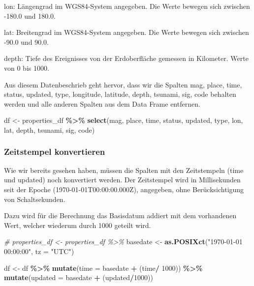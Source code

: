 \documentclass[
]{article}
\newenvironment{Shaded}{\begin{snugshade}}{\end{snugshade}}
\newcommand{\AttributeTok}[1]{\textcolor[rgb]{0.13,0.29,0.53}{#1}}
\newcommand{\CommentTok}[1]{\textcolor[rgb]{0.56,0.35,0.01}{\textit{#1}}}
\newcommand{\DecValTok}[1]{\textcolor[rgb]{0.00,0.00,0.81}{#1}}
\newcommand{\FunctionTok}[1]{\textcolor[rgb]{0.13,0.29,0.53}{\textbf{#1}}}
\newcommand{\NormalTok}[1]{#1}
\newcommand{\OtherTok}[1]{\textcolor[rgb]{0.56,0.35,0.01}{#1}}
\newcommand{\SpecialCharTok}[1]{\textcolor[rgb]{0.81,0.36,0.00}{\textbf{#1}}}
\newcommand{\StringTok}[1]{\textcolor[rgb]{0.31,0.60,0.02}{#1}}
\begin{document}
lon: Längengrad im WGS84-System angegeben. Die Werte bewegen sich
zwischen -180.0 und 180.0.

lat: Breitengrad im WGS84-System angegeben. Die Werte bewegen sich
zwischen -90.0 und 90.0.

depth: Tiefe des Ereignisses von der Erdoberfläche gemessen in
Kilometer. Werte von 0 bis 1000.

Aus diesem Datenbeschrieb geht hervor, dass wir die Spalten mag, place,
time, status, updated, type, longitude, latitude, depth, tsunami, sig,
code behalten werden und alle anderen Spalten aus dem Data Frame
entfernen.

\begin{Shaded}
\begin{Highlighting}[]
\NormalTok{df }\OtherTok{\textless{}{-}}\NormalTok{ properties\_df }\SpecialCharTok{\%\textgreater{}\%} \FunctionTok{select}\NormalTok{(mag, place, time, status, updated, type, lon, lat, depth, tsunami, sig, code)}
\end{Highlighting}
\end{Shaded}

\hypertarget{zeitstempel-konvertieren}{%
\subsubsection{Zeitstempel
konvertieren}\label{zeitstempel-konvertieren}}

Wie wir bereits gesehen haben, müssen die Spalten mit den Zeitstempeln
(time und updated) noch konvertiert werden. Der Zeitstempel wird in
Millisekunden seit der Epoche (1970-01-01T00:00:00.000Z), angegeben,
ohne Berücksichtigung von Schaltsekunden.

Dazu wird für die Berechnung das Basisdatum addiert mit dem vorhandenen
Wert, welcher wiederum durch 1000 geteilt wird.

\begin{Shaded}
\begin{Highlighting}[]
\CommentTok{\# properties\_df \textless{}{-} properties\_df \%\textgreater{}\% }
\NormalTok{basedate }\OtherTok{\textless{}{-}} \FunctionTok{as.POSIXct}\NormalTok{(}\StringTok{"1970{-}01{-}01 00:00:00"}\NormalTok{, }\AttributeTok{tz =} \StringTok{"UTC"}\NormalTok{)}

\NormalTok{df }\OtherTok{\textless{}{-}}\NormalTok{ df }\SpecialCharTok{\%\textgreater{}\%} 
  \FunctionTok{mutate}\NormalTok{(}\AttributeTok{time =}\NormalTok{ basedate }\SpecialCharTok{+}\NormalTok{ (time}\SpecialCharTok{/} \DecValTok{1000}\NormalTok{)) }\SpecialCharTok{\%\textgreater{}\%} 
  \FunctionTok{mutate}\NormalTok{(}\AttributeTok{updated =}\NormalTok{ basedate }\SpecialCharTok{+}\NormalTok{ (updated}\SpecialCharTok{/}\DecValTok{1000}\NormalTok{))}
\end{Highlighting}
\end{Shaded}
\end{document}
